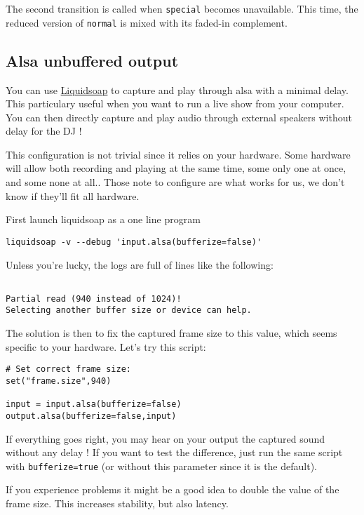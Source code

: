 The second transition is called when \verb+special+ becomes unavailable. This time, the reduced version of \verb+normal+ is mixed with its faded-in complement.

\subsection{Alsa unbuffered output }
You can use \href{index.html}{Liquidsoap} to capture and play through alsa with a minimal delay. This particulary useful when you want to run a live show from your computer. You can then directly capture and play audio through external speakers without delay for the DJ !

This configuration is not trivial since it relies on your hardware. Some hardware will allow both recording and playing at the same time, some only one at once, and some none at all.. Those note to configure are what works for us, we don't know if they'll fit all hardware.

First launch liquidsoap as a one line program

\begin{verbatim}
liquidsoap -v --debug 'input.alsa(bufferize=false)'
\end{verbatim}
Unless you're lucky, the logs are full of lines like the following:

\begin{verbatim}

Partial read (940 instead of 1024)!
Selecting another buffer size or device can help.
\end{verbatim}
The solution is then to fix the captured frame size to this value, which seems specific to your hardware. Let's try this script:

\begin{verbatim}
# Set correct frame size:
set("frame.size",940)

input = input.alsa(bufferize=false)
output.alsa(bufferize=false,input)
\end{verbatim}
If everything goes right, you may hear on your output the captured sound without any delay ! If you want to test the difference, just run the same script with \verb+bufferize=true+ (or without this parameter since it is the default).

If you experience problems it might be a good idea to double the value of the frame size. This increases stability, but also latency.

